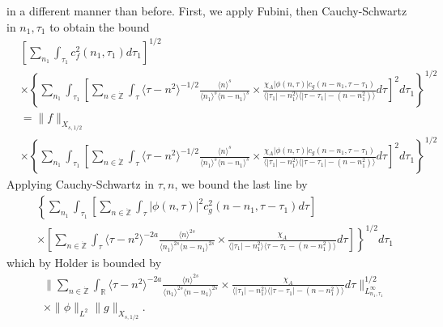 \documentclass[12pt,reqno]{amsart}
\numberwithin{equation}{section}  %
\newcommand{\rr}{\mathbb{R}}
\newcommand{\zz}{\mathbb{Z}}
\newcommand{\zzdot}{\dot{\zz}}
\begin{document}
in a different manner than before. First, we apply 
Fubini, then Cauchy-Schwartz in $n_{1}, \tau_{1}$ to obtain the bound
%
%
\begin{equation*}
\begin{split}
  & \left[ \sum_{n_{1}} \int_{\tau_{1}} c_{f}^{2}(n_{1}, \tau_{1}) d \tau_{1}
  \right]^{1/2}
  \\
  & \times \left \{\sum_{n_{1}} \int_{\tau_{1}}   
 \left[
 \sum_{n \in \zzdot} \int_{\tau} \langle \tau - n^{2} \rangle ^{-1/2}
   \frac{\langle n \rangle ^{s}}{\langle n_{1} \rangle ^{s} \langle
   n - n_{1}\rangle ^{s}} \times \frac{\chi_{A} |\phi(n, \tau)| c_{g}(n -
   n_{1}, \tau - \tau_{1})
}{\langle | \tau_{1} | - n_{1}^{2} \rangle \langle | \tau -
  \tau_{1} | - (n - n_{1}^{2}) \rangle} d \tau 
  \right]^{2} d \tau_{1} \right \}^{1/2}
  \\
  & = \| f \|_{X_{s,1/2}}
  \\
  & \times \left \{\sum_{n_{1}} \int_{\tau_{1}}   
 \left[
 \sum_{n \in \zzdot} \int_{\tau} \langle \tau - n^{2} \rangle ^{-1/2}
   \frac{\langle n \rangle ^{s}}{\langle n_{1} \rangle ^{s} \langle
   n - n_{1}\rangle ^{s}} \times \frac{\chi_{A}|\phi(n, \tau)| c_{g}(n -
   n_{1}, \tau - \tau_{1}) 
}{\langle | \tau_{1} | - n_{1}^{2} \rangle \langle | \tau -
  \tau_{1} | - (n - n_{1}^{2}) \rangle} d \tau 
  \right]^{2} d \tau_{1}  \right \}^{1/2}
\end{split}
\end{equation*}
%
Applying Cauchy-Schwartz in $\tau, n$, we bound the last line by 
%
%
\begin{equation*}
\begin{split}
  & \left \{\sum_{n_{1}} \int_{\tau_{1}}   
  \left [ \sum_{n \in \zzdot} \int_{\tau}
  | \phi(n, \tau)|^{2} c_{g}^{2}(n - n_{1}, \tau - \tau_{1}) d \tau  
    \right ] \right . 
   \\
   & \left. \times \left [ \sum_{n \in \zzdot} \int_{\tau} 
\langle \tau - n^{2} \rangle ^{-2a}
     \frac{\langle n \rangle
   ^{2s}}{\langle n_{1} \rangle ^{2s} \langle n - n_{1}\rangle ^{2s}}
   \times \frac{\chi_{A}}{\langle | \tau_{1} |
   - n_{1}^{2} \rangle  \langle \tau - \tau_{1} - (n - n_{1}^{2})
   \rangle} d \tau  \right ] \right \}^{1/2}d \tau_{1} 
\end{split}
\end{equation*}
%
%
which by Holder is bounded by 
%
%
%
\begin{equation}
  \label{integral-bound-2nd-form-per}
\begin{split}
  & \| \sum_{n \in \zzdot} \int_{\rr} 
\langle \tau - n^{2} \rangle ^{-2a}
  \frac{\langle n \rangle ^{2s}}{\langle n_{1} \rangle ^{2s} \langle
  n - n_{1}\rangle ^{2s}}  \times \frac{\chi_{A}}{\langle | \tau_{1} | - n_{1}^{2} \rangle  \langle | \tau -
  \tau_{1} | - (n - n_{1}^{2}) \rangle} d \tau 
  \|_{L^{\infty}_{n_{1}, \tau_{1}}}^{1/2}
  \\
  & \times \|\phi\|_{L^{2}} \| g \|_{X_{s,1/2}}.
\end{split}
\end{equation}
\end{document}
